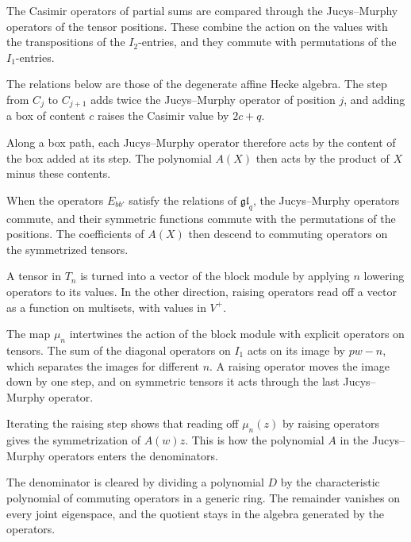 The Casimir operators of partial sums are compared through the Jucys--Murphy operators of the tensor
positions. These combine the action on the values with the transpositions of the $I_2$-entries, and they
commute with permutations of the $I_1$-entries.

The relations below are those of the degenerate affine Hecke algebra. The step from $C_j$ to $C_{j+1}$ adds
twice the Jucys--Murphy operator of position $j$, and adding a box of content $c$ raises the Casimir value
by $2c+q$.

Along a box path, each Jucys--Murphy operator therefore acts by the content of the box added at its step.
The polynomial $A(X)$ then acts by the product of $X$ minus these contents.

When the operators $E_{bb'}$ satisfy the relations of $\mathfrak{gl}_q$, the Jucys--Murphy operators commute, and
their symmetric functions commute with the permutations of the positions. The coefficients of $A(X)$ then
descend to commuting operators on the symmetrized tensors.

A tensor in $T_n$ is turned into a vector of the block module by applying $n$ lowering operators to its values.
In the other direction, raising operators read off a vector as a function on multisets, with values in $V^+$.

The map $\mu_n$ intertwines the action of the block module with explicit operators on tensors. The sum of the
diagonal operators on $I_1$ acts on its image by $pw-n$, which separates the images for different $n$. A raising
operator moves the image down by one step, and on symmetric tensors it acts through the last Jucys--Murphy
operator.

Iterating the raising step shows that reading off $\mu_n(z)$ by raising operators gives the symmetrization of
$A(w)z$. This is how the polynomial $A$ in the Jucys--Murphy operators enters the denominators.

The denominator is cleared by dividing a polynomial $D$ by the characteristic polynomial of commuting operators
in a generic ring. The remainder vanishes on every joint eigenspace, and the quotient stays in the algebra
generated by the operators.

